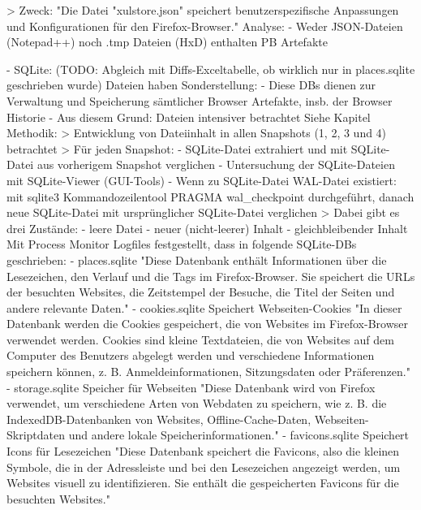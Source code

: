 	> %
		Zweck:
			"Die Datei "xulstore.json" speichert benutzerspezifische Anpassungen und Konfigurationen für den Firefox-Browser."
	Analyse:
		- Weder JSON-Dateien (Notepad++) noch .tmp Dateien (HxD) enthalten PB Artefakte
		
- SQLite: (TODO: Abgleich mit Diffs-Exceltabelle, ob wirklich nur in places.sqlite geschrieben wurde)
	Dateien haben Sonderstellung:
		- Diese DBs dienen zur Verwaltung und Speicherung sämtlicher Browser Artefakte, insb. der Browser Historie
		- Aus diesem Grund: Dateien intensiver betrachtet
	Siehe Kapitel Methodik:
		> Entwicklung von Dateiinhalt in allen Snapshots (1, 2, 3 und 4) betrachtet
		> Für jeden Snapshot: 
			- SQLite-Datei extrahiert und mit SQLite-Datei aus vorherigem Snapshot verglichen
			- Untersuchung der SQLite-Dateien mit SQLite-Viewer (GUI-Tools)
			- Wenn zu SQLite-Datei WAL-Datei existiert: mit sqlite3 Kommandozeilentool PRAGMA wal\_checkpoint durchgeführt, danach neue SQLite-Datei mit ursprünglicher SQLite-Datei verglichen
		> Dabei gibt es drei Zustände: 
			- leere Datei
			- neuer (nicht-leerer) Inhalt
			- gleichbleibender Inhalt
	Mit Process Monitor Logfiles festgestellt, dass in folgende SQLite-DBs geschrieben: 
		- places.sqlite
			"Diese Datenbank enthält Informationen über die Lesezeichen, den Verlauf und die Tags im Firefox-Browser. Sie speichert die URLs der besuchten Websites, die Zeitstempel der Besuche, die Titel der Seiten und andere relevante Daten."
		- cookies.sqlite						Speichert Webseiten-Cookies
			"In dieser Datenbank werden die Cookies gespeichert, die von Websites im Firefox-Browser verwendet werden. Cookies sind kleine Textdateien, die von Websites auf dem Computer des Benutzers abgelegt werden und verschiedene Informationen speichern können, z. B. Anmeldeinformationen, Sitzungsdaten oder Präferenzen."
		- storage.sqlite						Speicher für Webseiten
			"Diese Datenbank wird von Firefox verwendet, um verschiedene Arten von Webdaten zu speichern, wie z. B. die IndexedDB-Datenbanken von Websites, Offline-Cache-Daten, Webseiten-Skriptdaten und andere lokale Speicherinformationen."
		- favicons.sqlite						Speichert Icons für Lesezeichen
			"Diese Datenbank speichert die Favicons, also die kleinen Symbole, die in der Adressleiste und bei den Lesezeichen angezeigt werden, um Websites visuell zu identifizieren. Sie enthält die gespeicherten Favicons für die besuchten Websites."
